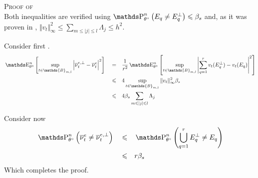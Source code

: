 \begin{pro}{\textsc{Proof of } \\}\label{PROD.5.5}
Both inequalities are verified using $\P_{\theta^{\circ}}^{n}\left(E_{q} \neq E^{\perp}_{q}\right) \leq \beta_{s}$ and, as it was proven in , $\Vert v_{t} \Vert_{\infty}^{2} \leq \sum\limits_{m \leq \vert j \vert \leq l}\Lambda_{j} \leq h^{2}$.

\medskip

Consider first .
\begin{alignat*}{3}
& \E_{\theta^{\circ}}^{n}\left[\sup\limits_{t \in \mathds{B}_{m, l}} \left\vert \overline{\nu}^{e, \perp}_{t} - \overline{\nu}^{e}_{t} \right\vert^{2} \right] && = && \frac{1}{r^{2}}\E_{\theta^{\circ}}^{n}\left[\sup\limits_{t \in \mathds{B}_{m, l}} \left\vert \sum\limits_{q = 1}^{r} v_{t}(E^{\perp}_{q}) - v_{t}(E_{q})  \right\vert^{2} \right]\\
& && \leq && 4 \sup\limits_{t \in\mathds{B}_{m, l}} \Vert v_{t} \Vert_{\infty}^{2} \beta_{s}\\
& && \leq && 4 \beta_{s} \sum\limits_{m \leq \vert j \vert \leq l} \Lambda_{j}
\end{alignat*}

Consider now 
\begin{alignat*}{3}
& \P_{\theta^{\circ}}^{n}\left(\overline{\nu}_{t}^{e} \neq \overline{\nu}_{t}^{e, \perp}\right) && \leq && \P_{\theta^{\circ}}^{n}\left(\bigcup\limits_{q = 1}^{r} E_{q}^{\perp} \neq E_{q}\right)\\
& && \leq && r \beta_{s}
\end{alignat*}
Which completes the proof.

\qedsymbol
\end{pro}

